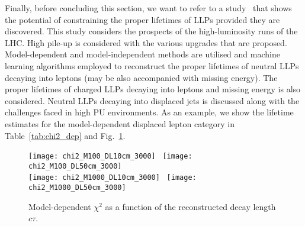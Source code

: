 \documentclass[10pt]{article}
\begin{document}
Finally, before concluding this section, we want to refer to a study~\cite{Banerjee:2019ktv} that shows the potential of constraining the proper lifetimes of LLPs provided they are discovered. This study considers the prospects of the high-luminosity runs of the LHC. High pile-up is considered with the various upgrades that are proposed. Model-dependent and model-independent methods are utilised and machine learning algorithms employed to reconstruct the proper lifetimes of neutral LLPs decaying into leptons (may be also accompanied with missing energy). The proper lifetimes of charged LLPs decaying into leptons and missing energy is also considered. Neutral LLPs decaying into displaced jets is discussed along with the challenges faced in high PU environments. As an example, we show the lifetime estimates for the model-dependent displaced lepton category in Table~\ref{tab:chi2_dep} and Fig.~\ref{fig:chi2_dep}.

\begin{figure}
	\centering
	\texttt{[image: chi2\_M100\_DL10cm\_3000]}~
	\texttt{[image: chi2\_M100\_DL50cm\_3000]} \\[2mm]
	\texttt{[image: chi2\_M1000\_DL10cm\_3000]}~
	\texttt{[image: chi2\_M1000\_DL50cm\_3000]}
	\caption{Model-dependent $\chi^2$ as a function of the reconstructed decay length $c\tau$.}
	\label{fig:chi2_dep}
\end{figure}
\end{document}
